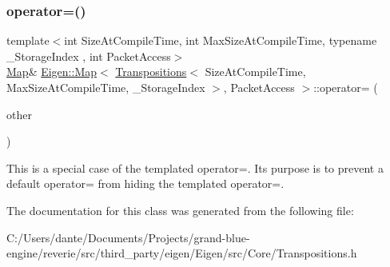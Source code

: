 \subsubsection{\texorpdfstring{operator=()}{operator=()}\hspace{0.1cm}{\footnotesize\ttfamily [2/2]}}
{\footnotesize\ttfamily template$<$int Size\+At\+Compile\+Time, int Max\+Size\+At\+Compile\+Time, typename \+\_\+\+Storage\+Index , int Packet\+Access$>$ \\
\mbox{\hyperlink{class_eigen_1_1_map}{Map}}\& \mbox{\hyperlink{class_eigen_1_1_map}{Eigen\+::\+Map}}$<$ \mbox{\hyperlink{class_eigen_1_1_transpositions}{Transpositions}}$<$ Size\+At\+Compile\+Time, Max\+Size\+At\+Compile\+Time, \+\_\+\+Storage\+Index $>$, Packet\+Access $>$\+::operator= (\begin{DoxyParamCaption}\item[{const \mbox{\hyperlink{class_eigen_1_1_map}{Map}}$<$ \mbox{\hyperlink{class_eigen_1_1_transpositions}{Transpositions}}$<$ Size\+At\+Compile\+Time, Max\+Size\+At\+Compile\+Time, \+\_\+\+Storage\+Index $>$, Packet\+Access $>$ \&}]{other }\end{DoxyParamCaption})\hspace{0.3cm}{\ttfamily [inline]}}

This is a special case of the templated operator=. Its purpose is to prevent a default operator= from hiding the templated operator=. 

The documentation for this class was generated from the following file\+:\begin{DoxyCompactItemize}
\item 
C\+:/\+Users/dante/\+Documents/\+Projects/grand-\/blue-\/engine/reverie/src/third\+\_\+party/eigen/\+Eigen/src/\+Core/Transpositions.\+h\end{DoxyCompactItemize}

